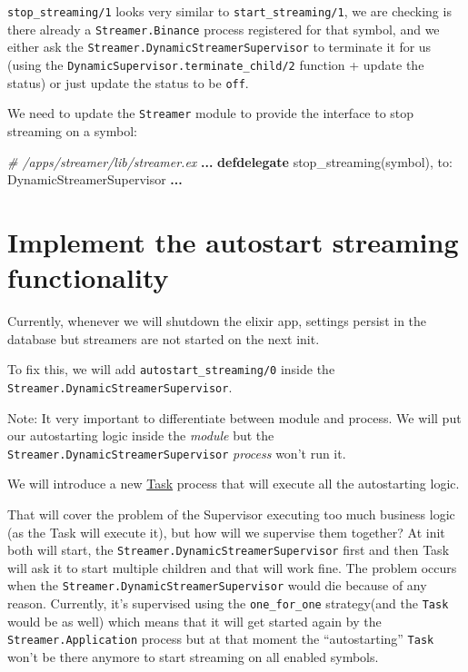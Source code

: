 \documentclass[
]{book}
\newenvironment{Shaded}{\begin{snugshade}}{\end{snugshade}}
\newcommand{\CommentTok}[1]{\textcolor[rgb]{0.56,0.35,0.01}{\textit{#1}}}
\newcommand{\ConstantTok}[1]{\textcolor[rgb]{0.00,0.00,0.00}{#1}}
\newcommand{\KeywordTok}[1]{\textcolor[rgb]{0.13,0.29,0.53}{\textbf{#1}}}
\newcommand{\NormalTok}[1]{#1}
\newcommand{\OperatorTok}[1]{\textcolor[rgb]{0.81,0.36,0.00}{\textbf{#1}}}
\newcommand{\VariableTok}[1]{\textcolor[rgb]{0.00,0.00,0.00}{#1}}
\begin{document}
\texttt{stop\_streaming/1} looks very similar to \texttt{start\_streaming/1}, we are checking is there already a \texttt{Streamer.Binance} process registered for that symbol, and we either ask the \texttt{Streamer.DynamicStreamerSupervisor} to terminate it for us (using the \texttt{DynamicSupervisor.terminate\_child/2} function + update the status) or just update the status to be \texttt{off}.

We need to update the \texttt{Streamer} module to provide the interface to stop streaming on a symbol:

\begin{Shaded}
\begin{Highlighting}[]
\CommentTok{\# /apps/streamer/lib/streamer.ex}
  \OperatorTok{...}
  \KeywordTok{defdelegate}\NormalTok{ stop\_streaming(symbol), }\VariableTok{to:} \ConstantTok{DynamicStreamerSupervisor}
  \OperatorTok{...}
\end{Highlighting}
\end{Shaded}

\hypertarget{implement-the-autostart-streaming-functionality}{%
\section{Implement the autostart streaming functionality}\label{implement-the-autostart-streaming-functionality}}

Currently, whenever we will shutdown the elixir app, settings persist in the database but streamers are not started on the next init.

To fix this, we will add \texttt{autostart\_streaming/0} inside the \texttt{Streamer.DynamicStreamerSupervisor}.

Note: It very important to differentiate between module and process. We will put our autostarting logic inside the \emph{module} but the \texttt{Streamer.DynamicStreamerSupervisor} \emph{process} won't run it.

We will introduce a new \href{https://hexdocs.pm/elixir/master/Task.html}{Task} process that will execute all the autostarting logic.

That will cover the problem of the Supervisor executing too much business logic (as the Task will execute it), but how will we supervise them together?
At init both will start, the \texttt{Streamer.DynamicStreamerSupervisor} first and then Task will ask it to start multiple children and that will work fine. The problem occurs when the \texttt{Streamer.DynamicStreamerSupervisor} would die because of any reason. Currently, it's supervised using the \texttt{one\_for\_one} strategy(and the \texttt{Task} would be as well) which means that it will get started again by the \texttt{Streamer.Application} process but at that moment the ``autostarting'' \texttt{Task} won't be there anymore to start streaming on all enabled symbols.
\end{document}
